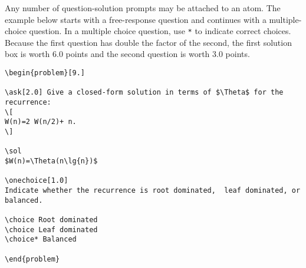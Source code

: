 \begin{cluster}
\label{grp:xmpl:quiz::multiple-choice-and-free-response-questions}

\begin{example}
\label{xmpl:quiz::multiple-choice-and-free-response-questions}
Any number of question-solution prompts may be attached to an atom.
The example below starts with a free-response question and continues
with a multiple-choice question.
In a multiple choice question, use \lstinline`*` to indicate correct choices.
Because the first question has double the factor of the second, the
first solution box is worth $6.0$ points and the second question is
worth $3.0$ points.

\begin{lstlisting}
\begin{problem}[9.]

\ask[2.0] Give a closed-form solution in terms of $\Theta$ for the recurrence:
\[
W(n)=2 W(n/2)+ n.
\]

\sol
$W(n)=\Theta(n\lg{n})$

\onechoice[1.0]
Indicate whether the recurrence is root dominated,  leaf dominated, or balanced.

\choice Root dominated
\choice Leaf dominated
\choice* Balanced

\end{problem}
\end{lstlisting}

\end{example}
\end{cluster}

